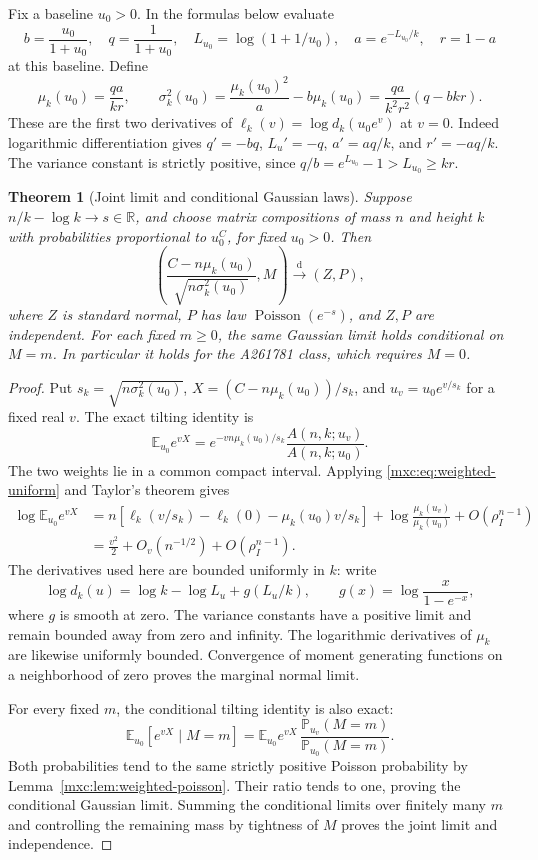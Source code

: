 \documentclass[11pt]{article}
\numberwithin{equation}{section}
\newtheorem{theorem}{Theorem}[section]
\theoremstyle{definition}
\theoremstyle{remark}
\newcommand{\E}{\mathbb E}
\newcommand{\Pp}{\mathbb P}
\DeclareMathOperator{\Pois}{Poisson}
\begin{document}
Fix a baseline $u_0>0$. In the formulas below evaluate
\[
 b=\frac{u_0}{1+u_0},\quad q=\frac1{1+u_0},\quad
 L_{u_0}=\log(1+1/u_0),\quad
 a=e^{-L_{u_0}/k},\quad r=1-a
\]
at this baseline. Define
\begin{equation}\label{mxc:eq:column-constants}
 \mu_k(u_0)=\frac{qa}{kr},\qquad
 \sigma_k^2(u_0)=\frac{\mu_k(u_0)^2}{a}-b\mu_k(u_0)
 =\frac{qa}{k^2r^2}(q-bkr).
\end{equation}
These are the first two derivatives of
$\ell_k(v)=\log d_k(u_0e^v)$ at $v=0$.
Indeed logarithmic differentiation gives
$q'=-bq$, $L_u'=-q$, $a'=aq/k$, and $r'=-aq/k$.
The variance constant is strictly positive, since
$q/b=e^{L_{u_0}}-1>L_{u_0}\ge kr$.

\begin{theorem}[Joint limit and conditional Gaussian laws]\label{mxc:thm:joint}
Suppose $n/k-\log k\to s\in\mathbb R$, and choose matrix
compositions of mass $n$ and height $k$ with probabilities proportional
to $u_0^C$, for fixed $u_0>0$. Then
\begin{equation}\label{mxc:eq:joint}
 \left(\frac{C-n\mu_k(u_0)}{\sqrt{n\sigma_k^2(u_0)}},M\right)
 \xrightarrow{\mathrm d}(Z,P),
\end{equation}
where $Z$ is standard normal, $P$ has law $\Pois(e^{-s})$, and
$Z,P$ are independent. For each fixed $m\ge0$, the same Gaussian
limit holds conditional on $M=m$. In particular it holds for the
A261781 class, which requires $M=0$.
\end{theorem}
\begin{proof}
Put $s_k=\sqrt{n\sigma_k^2(u_0)}$, $X=(C-n\mu_k(u_0))/s_k$,
and $u_v=u_0e^{v/s_k}$ for a fixed real $v$. The exact tilting identity is
\[
 \E_{u_0}e^{vX}
 =e^{-vn\mu_k(u_0)/s_k}\frac{A(n,k;u_v)}{A(n,k;u_0)}.
\]
The two weights lie in a common compact interval. Applying
\eqref{mxc:eq:weighted-uniform} and Taylor's theorem gives
\begin{align*}
 \log\E_{u_0}e^{vX}
 &=n\left[\ell_k(v/s_k)-\ell_k(0)-\mu_k(u_0)v/s_k\right]
   +\log\frac{\mu_k(u_v)}{\mu_k(u_0)}+O(\rho_I^{n-1})\\
 &=\frac{v^2}{2}+O_v(n^{-1/2})+O(\rho_I^{n-1}).
\end{align*}
The derivatives used here are bounded uniformly in $k$: write
\[
 \log d_k(u)=\log k-\log L_u+
 g(L_u/k),\qquad g(x)=\log\frac{x}{1-e^{-x}},
\]
where $g$ is smooth at zero. The variance constants have a positive
limit and remain bounded away from zero and infinity. The logarithmic
derivatives of $\mu_k$ are likewise uniformly bounded. Convergence
of moment generating functions on a neighborhood of zero proves the
marginal normal limit.

For every fixed $m$, the conditional tilting identity is also exact:
\[
 \E_{u_0}[e^{vX}\mid M=m]
 =\E_{u_0}e^{vX}\,
   \frac{\Pp_{u_v}(M=m)}{\Pp_{u_0}(M=m)}.
\]
Both probabilities tend to the same strictly positive Poisson
probability by Lemma~\ref{mxc:lem:weighted-poisson}. Their ratio tends to
one, proving the conditional Gaussian limit. Summing the conditional
limits over finitely many $m$ and controlling the remaining mass by
tightness of $M$ proves the joint limit and independence.
\end{proof}
\end{document}
